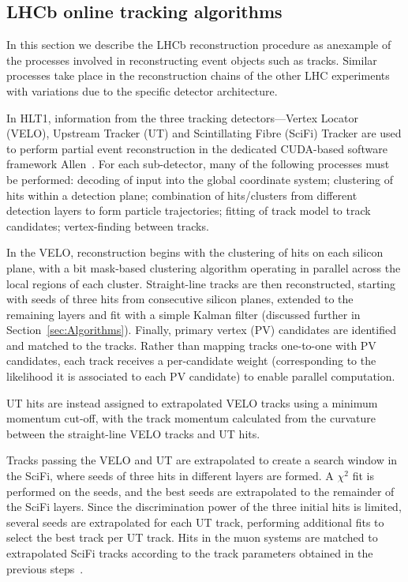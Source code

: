 \subsection{LHCb online tracking algorithms}

In this section we describe the LHCb reconstruction procedure as anexample of the processes involved in reconstructing event objects such as tracks. Similar processes take place in the reconstruction chains of the other LHC experiments with variations due to the specific detector architecture.

In HLT1, information from the three tracking detectors—Vertex Locator (VELO), Upstream Tracker (UT) and Scintillating Fibre (SciFi) Tracker 
are used to perform partial event reconstruction in the dedicated CUDA-based software framework Allen~\cite{LHCb_Allen_GPU}. 
For each sub-detector, many of the following processes must be performed: decoding of input into the global coordinate system; clustering of hits within a detection plane; combination of hits/clusters from different detection layers to form particle trajectories; fitting of track model to track candidates; vertex-finding between tracks.

In the VELO, reconstruction begins with the clustering of hits on each silicon plane, with a bit mask-based clustering algorithm operating in parallel across the local regions of each cluster. Straight-line tracks are then reconstructed, starting with seeds of three hits from consecutive silicon planes, extended to the remaining layers and fit with a simple Kalman filter (discussed further in Section~\ref{sec:Algorithms}). 
Finally, primary vertex (PV) candidates are identified and matched to the tracks. Rather than mapping tracks one-to-one with PV candidates, each track receives a per-candidate weight (corresponding to the likelihood it is associated to each PV candidate) to enable parallel computation. 

UT hits are instead assigned to extrapolated VELO tracks using a minimum momentum cut-off, with the track momentum calculated from the curvature between the straight-line VELO tracks and UT hits.

Tracks passing the VELO and UT are extrapolated to create a search window in the SciFi, where seeds of three hits in different layers are formed. A $\chi^2$ fit is performed on the seeds, and the best seeds are extrapolated to the remainder of the SciFi layers. Since the discrimination power of the three initial hits is limited, several seeds are extrapolated for each UT track, performing additional fits to select the best track per UT track. Hits in the muon systems are matched to extrapolated SciFi tracks according to the track parameters obtained in the previous steps~\cite{LHCb:2023hlw, LHCb_Allen_GPU}.

